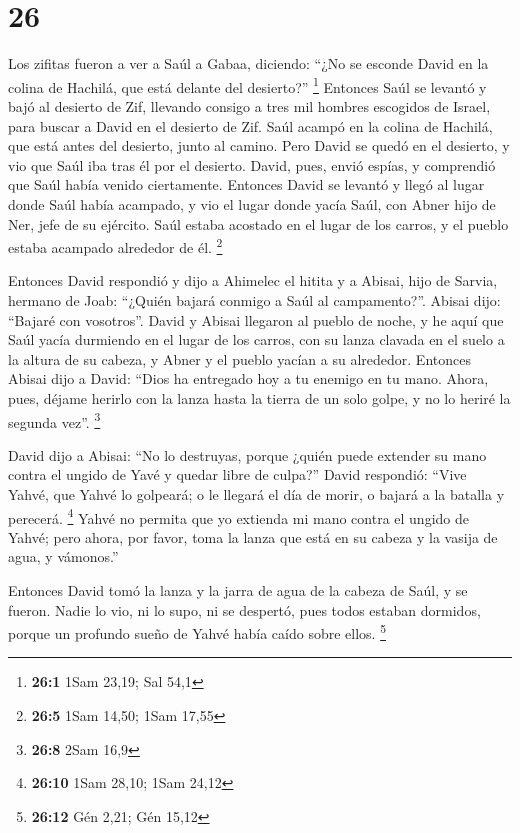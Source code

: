 \hypertarget{section-25}{%
\section{26}\label{section-25}}

 Los zifitas fueron a ver a Saúl a Gabaa, diciendo: ``¿No
se esconde David en la colina de Hachilá, que está delante del
desierto?'' \footnote{\textbf{26:1} 1Sam 23,19; Sal 54,1} 
Entonces Saúl se levantó y bajó al desierto de Zif, llevando consigo a
tres mil hombres escogidos de Israel, para buscar a David en el desierto
de Zif.  Saúl acampó en la colina de Hachilá, que está
antes del desierto, junto al camino. Pero David se quedó en el desierto,
y vio que Saúl iba tras él por el desierto.  David, pues,
envió espías, y comprendió que Saúl había venido ciertamente.
 Entonces David se levantó y llegó al lugar donde Saúl
había acampado, y vio el lugar donde yacía Saúl, con Abner hijo de Ner,
jefe de su ejército. Saúl estaba acostado en el lugar de los carros, y
el pueblo estaba acampado alrededor de él. \footnote{\textbf{26:5} 1Sam
  14,50; 1Sam 17,55}

 Entonces David respondió y dijo a Ahimelec el hitita y a
Abisai, hijo de Sarvia, hermano de Joab: ``¿Quién bajará conmigo a Saúl
al campamento?''. Abisai dijo: ``Bajaré con vosotros''. 
David y Abisai llegaron al pueblo de noche, y he aquí que Saúl yacía
durmiendo en el lugar de los carros, con su lanza clavada en el suelo a
la altura de su cabeza, y Abner y el pueblo yacían a su alrededor.
 Entonces Abisai dijo a David: ``Dios ha entregado hoy a
tu enemigo en tu mano. Ahora, pues, déjame herirlo con la lanza hasta la
tierra de un solo golpe, y no lo heriré la segunda vez''. \footnote{\textbf{26:8}
  2Sam 16,9}

 David dijo a Abisai: ``No lo destruyas, porque ¿quién
puede extender su mano contra el ungido de Yavé y quedar libre de
culpa?''  David respondió: ``Vive Yahvé, que Yahvé lo
golpeará; o le llegará el día de morir, o bajará a la batalla y
perecerá. \footnote{\textbf{26:10} 1Sam 28,10; 1Sam 24,12}
 Yahvé no permita que yo extienda mi mano contra el
ungido de Yahvé; pero ahora, por favor, toma la lanza que está en su
cabeza y la vasija de agua, y vámonos.''

 Entonces David tomó la lanza y la jarra de agua de la
cabeza de Saúl, y se fueron. Nadie lo vio, ni lo supo, ni se despertó,
pues todos estaban dormidos, porque un profundo sueño de Yahvé había
caído sobre ellos. \footnote{\textbf{26:12} Gén 2,21; Gén 15,12}

